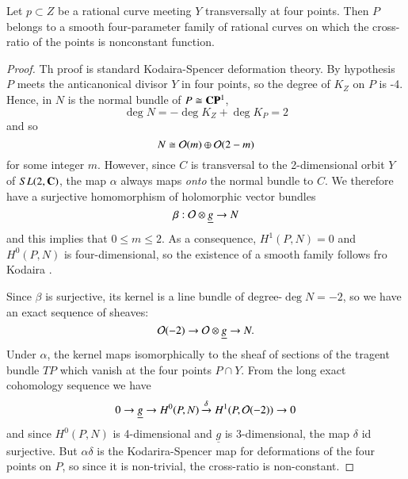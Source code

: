 \begin{prop}\label{art7-proposition-3}
Let $p \subset Z$ be a rational curve meeting $Y$ transversally at four points. Then $P$ belongs to a smooth four-parameter family of rational curves on which the cross-ratio of the points is nonconstant function.
\end{prop}

\begin{proof}
Th proof is standard Kodaira-Spencer deformation theory. By hypothesis $P$ meets the anticanonical divisor $Y$ in four points, so the degree of $K_{Z}$ on $P$ is -4. Hence, in $N$ is the normal bundle of $P \cong \mathbf{C}\mathbf{P}^{1}$,
$$
\deg N = -\deg K_{Z} + \deg K_{P} = 2
$$
and so
$$
N \cong \mathcal{O}(m) \oplus \mathcal{O}(2-m)
$$
for some integer $m$. However, since $C$ is transversal to the 2-dimensional orbit $Y$ of $SL(2, \mathbf{C})$, the map $\alpha$ always maps \textit{onto} the normal bundle to $C$. We therefore have a surjective homomorphism of holomorphic vector bundles
$$
\beta : \mathcal{O} \otimes \underline{g} \rightarrow N
$$
and this implies that $ 0 \leq m \leq  2$. As a consequence, $H^{1} (P ,N) = 0$ and $H^{0}(P, N)$ is four-dimensional, so the existence of a smooth family follows fro  Kodaira \cite{art7-key9}. 

Since $\beta$ is surjective, its kernel is a line bundle of degree-$\deg N = -2$, so we have an exact sequence of sheaves:
$$
\mathcal{O}(-2)\rightarrow \mathcal{O} \otimes \underline{g}\rightarrow N.
$$
Under $\alpha$, the kernel maps isomorphically to the sheaf of sections of the tragent bundle $TP$ which vanish at the four points $P\cap Y$. From the long exact cohomology sequence we have
$$
0 \rightarrow \underline{g}\rightarrow H^{0}(P, N)\xrightarrow{\delta} H^{1}(P, \mathcal{O}(-2))\rightarrow 0
$$
and since $H^{0}(P, N)$ is 4-dimensional and $\underline{g}$ is 3-dimensional, the map $\delta$ id surjective. But $\alpha \delta$ is the Kodarira-Spencer map for deformations of the four points on $P$, so since it is non-trivial, the cross-ratio is non-constant.
\end{proof}

